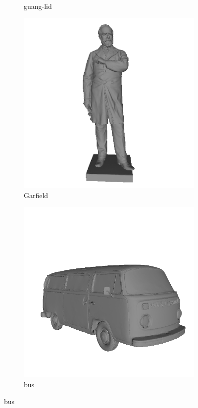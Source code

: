 \begin{figure}
\begin{subfigure}[b]{0.23\linewidth}
		\caption{guang-lid}
	\end{subfigure}
	\begin{subfigure}[b]{0.23\linewidth}
		\includegraphics[width=\linewidth]{./Figures/test-dataset/00.garfield.png}
		\caption{Garfield}
	\end{subfigure}
	\begin{subfigure}[b]{0.23\linewidth}
		\includegraphics[width=\linewidth]{./Figures/test-dataset/01.Bus.png}
		\caption{bus}
	\end{subfigure}


\end{figure}
